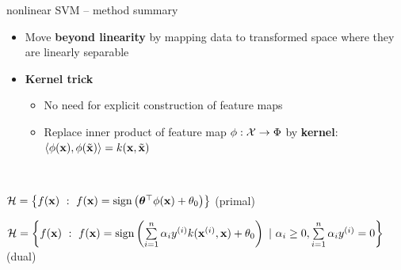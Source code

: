 \begin{frame}{nonlinear SVM -- method summary}

\footnotesize

   

\medskip

\begin{itemize}
  \item Move \textbf{beyond linearity} by mapping data to 
  transformed space where they are linearly separable
  \item \textbf{Kernel trick} %
  \begin{itemize}
    \item No need for explicit construction of feature maps
    \item Replace inner product of feature map $\phi: \mathcal{X} \to \Phi$ by \textbf{kernel}: $\left\langle \phi(\mathbf{x}), \phi(\tilde {\mathbf{x}}) \right\rangle = k(\mathbf{x}, \tilde {\mathbf{x}})$
  \end{itemize}
\end{itemize}


\medskip


 ~~

$\mathcal{H}  = \left \{f(\mathbf{x}) ~:~ f(\mathbf{x}) = \operatorname{sign} \left( \bm{\theta}^\top \phi(\mathbf{x}) + \theta_0 \right) \right \}$ (primal)

$\mathcal{H}  = \left \{f(\mathbf{x}) ~:~ f(\mathbf{x}) = \operatorname{sign} \left( \sum\limits_{i=1}^n \alpha_i y^{(i)} k(\mathbf{x}^{(i)}, \mathbf{x}) + \theta_0 \right) ~|~ \alpha_i \geq 0,  \sum\limits_{i=1}^n \alpha_i y^{(i)} = 0 \right \}$ (dual)%


\end{frame}
